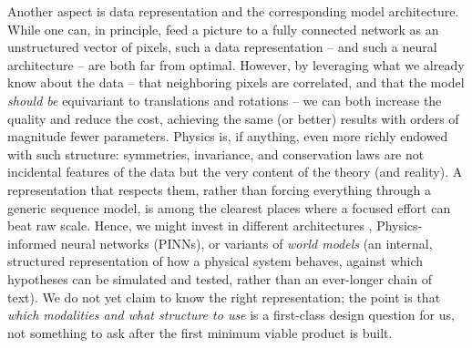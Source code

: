 Another aspect is data representation and the corresponding model architecture. While one can, in principle, feed a picture to a fully connected network as an unstructured vector of pixels, such a data representation -- and such a neural architecture -- are both far from optimal. However, by leveraging what we already know about the data -- that neighboring pixels are correlated, and that the model \emph{should be} equivariant to translations and rotations -- we can both increase the quality and reduce the cost, achieving the same (or better) results with orders of magnitude fewer parameters. Physics is, if anything, even more richly endowed with such structure: symmetries, invariance, and conservation laws are not incidental features of the data but the very content of the theory (and reality). A representation that respects them, rather than forcing everything through a generic sequence model, is among the clearest places where a focused effort can beat raw scale. Hence, we might invest in different architectures \cite{2606.18246}, Physics-informed neural networks (PINNs), or variants of \emph{world models} (an internal, structured representation of how a physical system behaves, against which hypotheses can be simulated and tested, rather than an ever-longer chain of text).
We do not yet claim to know the right representation; the point is that \emph{which modalities and what structure to use} is a first-class design question for us, not something to ask after the first minimum viable product is built.